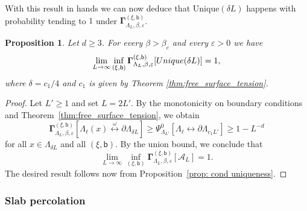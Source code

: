\documentclass[11pt,a4paper]{article}
\newtheorem{proposition}[theorem]{Proposition}
\theoremstyle{definition}
\numberwithin{equation}{section}
\begin{document}
With this result in hands we can now deduce that $\mathrm{Unique}(\delta L)$ happens with probability tending to $1$ under $\boldsymbol{\Gamma}^{(\xi,\mathsf{b})}_{\Lambda_L,\beta,\varepsilon}$.

\begin{proposition}\label{prop: uniqueness with sprinkling}
Let $d\geq 3$. For every $\beta>\beta_c$ and every $\varepsilon>0$ we have 
\begin{equation}
\lim_{L\to\infty} \inf_{(\xi,\mathsf{b})} \boldsymbol{\Gamma}^{(\xi,\mathsf{b})}_{\Lambda_L,\beta,\varepsilon}[\textup{Unique}(\delta L) ]=1,   
\end{equation}
where $\delta=c_1/4$ and $c_1$ is given by Theorem \textup{\ref{thm:free_surface_tension}}.
\end{proposition}

\begin{proof}
Let $L'\geq 1$ and set $L=2L'$. By the monotonicity on boundary conditions and Theorem~\ref{thm:free_surface_tension}, we obtain 
\begin{equation}\boldsymbol{\Gamma}^{(\xi,\mathsf{b})}_{\Lambda_L,\beta,\varepsilon}[\Lambda_\ell(x) \overset{\omega}{\longleftrightarrow} \partial \Lambda_{\delta L}] \geq \Psi^0_{\Lambda_{L'}}[\Lambda_\ell \longleftrightarrow \partial \Lambda_{c_1 L'}]\geq 1-L^{-d}
\end{equation}
for all $x\in\Lambda_{\delta L}$ and all $(\xi,\mathsf{b})$. 
By the union bound, we conclude that 
\begin{equation}
\lim_{L\to\infty} \inf_{(\xi,\mathsf{b})} \boldsymbol{\Gamma}^{(\xi,\mathsf{b})}_{\Lambda_L,\beta,\varepsilon}[\mathcal{A}_L]=1.
\end{equation}
The desired result follows now from Proposition~\ref{prop: cond uniqueness}.
\end{proof}


    
\subsubsection{Slab percolation}
\end{document}

